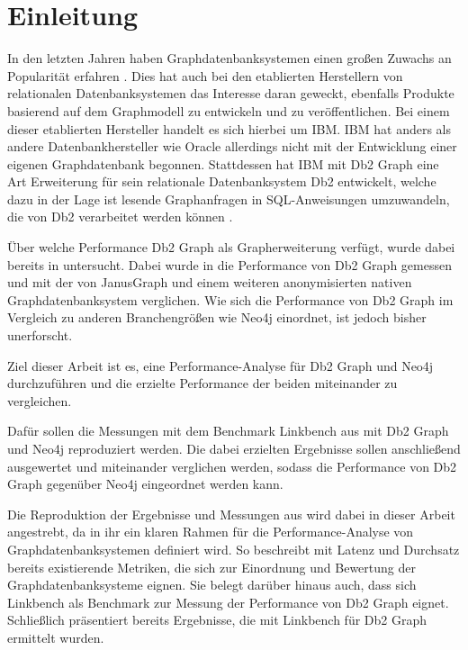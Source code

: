 \chapter{Einleitung}
\label{einleitung}

In den letzten Jahren haben Graphdatenbanksystemen einen großen Zuwachs an Popularität erfahren \cite{db_engines_ranking_july}. Dies hat auch bei den etablierten Herstellern von relationalen Datenbanksystemen das Interesse daran geweckt, ebenfalls Produkte basierend auf dem Graphmodell zu entwickeln und zu veröffentlichen. Bei einem dieser etablierten Hersteller handelt es sich hierbei um IBM. IBM hat anders als andere Datenbankhersteller wie Oracle allerdings nicht mit der Entwicklung einer eigenen Graphdatenbank begonnen. Stattdessen hat IBM mit Db2 Graph eine Art Erweiterung für sein relationale Datenbanksystem Db2 entwickelt, welche dazu in der Lage ist lesende Graphanfragen in SQL-Anweisungen umzuwandeln, die von Db2 verarbeitet werden können \cite{sigmod_tian}. 

Über welche Performance Db2 Graph als Grapherweiterung verfügt, wurde dabei bereits in \cite{sigmod_tian} untersucht. Dabei wurde in \cite{sigmod_tian} die Performance von Db2 Graph gemessen und mit der von JanusGraph und einem weiteren anonymisierten nativen Graphdatenbanksystem verglichen. Wie sich die Performance von Db2 Graph im Vergleich zu anderen Branchengrößen wie Neo4j einordnet, ist jedoch bisher unerforscht. 

Ziel dieser Arbeit ist es, eine Performance-Analyse für Db2 Graph und Neo4j durchzuführen und die erzielte Performance der beiden miteinander zu vergleichen.

Dafür sollen die Messungen mit dem Benchmark Linkbench aus \cite{sigmod_tian} mit Db2 Graph und Neo4j reproduziert werden. Die dabei erzielten Ergebnisse sollen anschließend ausgewertet und miteinander verglichen werden, sodass die Performance von Db2 Graph gegenüber Neo4j eingeordnet werden kann.

Die Reproduktion der Ergebnisse und Messungen aus \cite{sigmod_tian} wird dabei in dieser Arbeit angestrebt, da in ihr ein klaren Rahmen für die Performance-Analyse von Graphdatenbanksystemen definiert wird. So beschreibt \cite{sigmod_tian} mit Latenz und Durchsatz bereits existierende Metriken, die sich zur Einordnung und Bewertung der Graphdatenbanksysteme eignen. Sie belegt darüber hinaus auch, dass sich Linkbench als Benchmark zur Messung der Performance von Db2 Graph eignet. Schließlich präsentiert \cite{sigmod_tian} bereits Ergebnisse, die mit Linkbench für Db2 Graph ermittelt wurden. 

